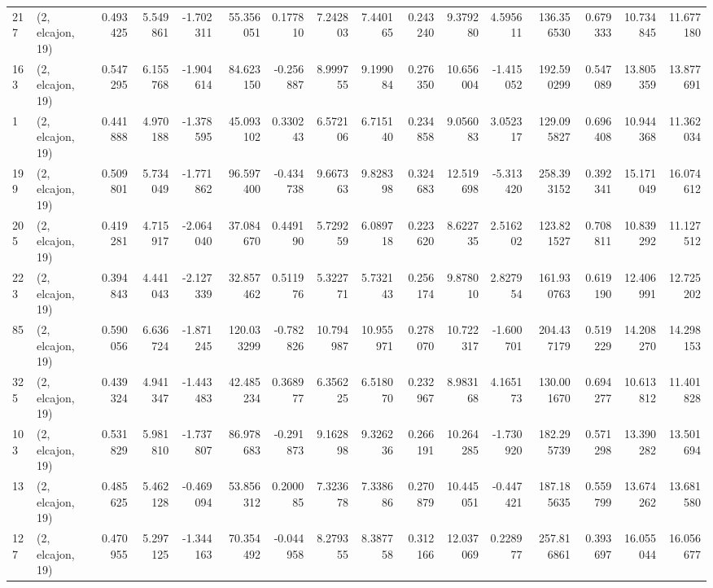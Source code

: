 \begin{tabular}{llrrrrrrrrrrrrrr}
217 &  (2, elcajon, 19) &   0.493425 &   5.549861 &  -1.702311 &    55.356051 &   0.177810 &   7.242803 &   7.440165 &  0.243240 &   9.379280 &   4.595611 &   136.356530 &  0.679333 &  10.734845 &  11.677180 \\
163 &  (2, elcajon, 19) &   0.547295 &   6.155768 &  -1.904614 &    84.623150 &  -0.256887 &   8.999755 &   9.199084 &  0.276350 &  10.656004 &  -1.415052 &   192.590299 &  0.547089 &  13.805359 &  13.877691 \\
1   &  (2, elcajon, 19) &   0.441888 &   4.970188 &  -1.378595 &    45.093102 &   0.330243 &   6.572106 &   6.715140 &  0.234858 &   9.056083 &   3.052317 &   129.095827 &  0.696408 &  10.944368 &  11.362034 \\
199 &  (2, elcajon, 19) &   0.509801 &   5.734049 &  -1.771862 &    96.597400 &  -0.434738 &   9.667363 &   9.828398 &  0.324683 &  12.519698 &  -5.313420 &   258.393152 &  0.392341 &  15.171049 &  16.074612 \\
205 &  (2, elcajon, 19) &   0.419281 &   4.715917 &  -2.064040 &    37.084670 &   0.449190 &   5.729259 &   6.089718 &  0.223620 &   8.622735 &   2.516202 &   123.821527 &  0.708811 &  10.839292 &  11.127512 \\
223 &  (2, elcajon, 19) &   0.394843 &   4.441043 &  -2.127339 &    32.857462 &   0.511976 &   5.322771 &   5.732143 &  0.256174 &   9.878010 &   2.827954 &   161.930763 &  0.619190 &  12.406991 &  12.725202 \\
85  &  (2, elcajon, 19) &   0.590056 &   6.636724 &  -1.871245 &   120.033299 &  -0.782826 &  10.794987 &  10.955971 &  0.278070 &  10.722317 &  -1.600701 &   204.437179 &  0.519229 &  14.208270 &  14.298153 \\
325 &  (2, elcajon, 19) &   0.439324 &   4.941347 &  -1.443483 &    42.485234 &   0.368977 &   6.356225 &   6.518070 &  0.232967 &   8.983168 &   4.165173 &   130.001670 &  0.694277 &  10.613812 &  11.401828 \\
103 &  (2, elcajon, 19) &   0.531829 &   5.981810 &  -1.737807 &    86.978683 &  -0.291873 &   9.162898 &   9.326236 &  0.266191 &  10.264285 &  -1.730920 &   182.295739 &  0.571298 &  13.390282 &  13.501694 \\
13  &  (2, elcajon, 19) &   0.485625 &   5.462128 &  -0.469094 &    53.856312 &   0.200085 &   7.323678 &   7.338686 &  0.270879 &  10.445051 &  -0.447421 &   187.185635 &  0.559799 &  13.674262 &  13.681580 \\
127 &  (2, elcajon, 19) &   0.470955 &   5.297125 &  -1.344163 &    70.354492 &  -0.044958 &   8.279355 &   8.387758 &  0.312166 &  12.037069 &   0.228977 &   257.816861 &  0.393697 &  16.055044 &  16.056677 \\

\end{tabular}
